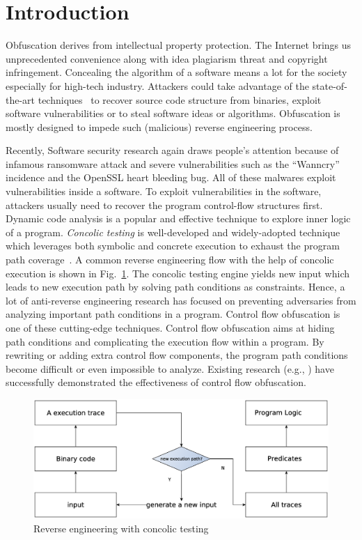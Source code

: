 \documentclass[lnicst]{svmultln}
\newcommand{\F}{Fig.}
\begin{document}
\section{Introduction}
%
Obfuscation derives from intellectual property protection. The Internet brings
us unprecedented convenience along with idea plagiarism threat and copyright
infringement. Concealing the algorithm of a software means a lot for the society
especially for high-tech industry. Attackers could take advantage of the
state-of-the-art techniques~\cite{Loop,Lee,Molnar} to recover source code
structure from binaries, exploit software vulnerabilities or to steal software
ideas or algorithms. Obfuscation is mostly designed to impede such (malicious)
reverse engineering process.

Recently, Software security research again draws people's attention because of
infamous ransomware attack and severe vulnerabilities such as the ``Wanncry''
incidence and the OpenSSL heart bleeding bug. All of these malwares exploit
vulnerabilities inside a software. To exploit vulnerabilities in the software,
attackers usually need to recover the program control-flow structures first.
Dynamic code analysis is a popular and effective technique to explore inner
logic of a program. \textit{Concolic testing} is well-developed and
widely-adopted technique which leverages both symbolic and concrete execution to
exhaust the program path coverage~\cite{Sen}. A common reverse engineering flow
with the help of concolic execution is shown in \F~\ref{fig:one}. The concolic
testing engine yields new input which leads to new execution path by solving
path conditions as constraints. Hence, a lot of anti-reverse
  engineering research has focused on preventing adversaries from analyzing
  important path conditions in a program\cite{Opaque,Sharif,Popov,Zhi,Wang:Zhi}.
Control flow obfuscation is one of these cutting-edge techniques. Control flow
obfuscation aims at hiding path conditions and complicating the execution flow
within a program. By rewriting or adding extra control flow components, the
program path conditions become difficult or even impossible to analyze. Existing
research (e.g., \cite{Ma}) have successfully demonstrated the effectiveness of
control flow obfuscation.

\begin{figure}
  \includegraphics[width=0.9\linewidth]{reverse_engineering.eps}
  \caption{Reverse engineering with concolic testing}
  \label{fig:one}
\end{figure}
\end{document}
